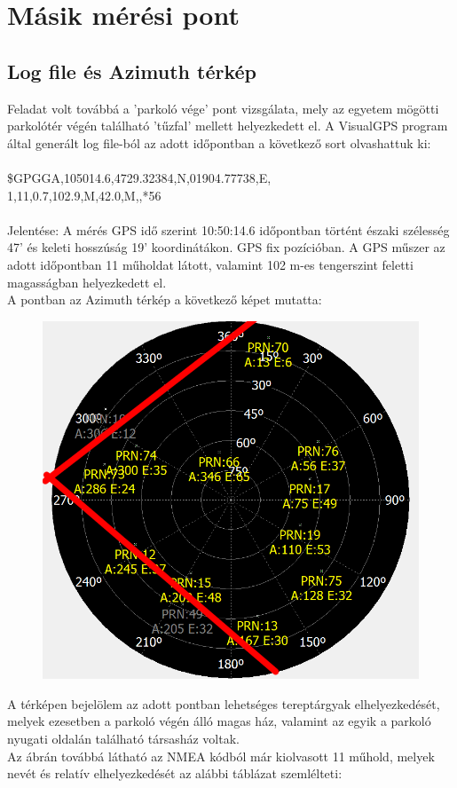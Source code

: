 \documentclass[10pt, conference,a4paper]{ITKproc}
\begin{document}
\section{Másik mérési pont}
\subsection{Log file és Azimuth térkép}
Feladat volt továbbá a 'parkoló vége' pont vizsgálata, mely az egyetem mögötti parkolótér végén található 'tűzfal' mellett helyezkedett el. A VisualGPS program által generált log file-ból az adott időpontban a következő sort olvashattuk ki: \\ \\
\$GPGGA,105014.6,4729.32384,N,01904.77738,E,\\1,11,0.7,102.9,M,42.0,M,,*56
\\ \\
Jelentése: A mérés GPS idő szerint 10:50:14.6 időpontban történt északi szélesség 47' és keleti hosszúság 19' koordinátákon. GPS fix pozícióban. A GPS műszer az adott időpontban 11 műholdat látott, valamint 102 m-es tengerszint feletti magasságban helyezkedett el. \\
A pontban az Azimuth térkép a következő képet mutatta: \\
\begin{figure}[h]
\includegraphics[scale=0.3]{azimuth_kozos_r}
\centering
\end{figure}
A térképen bejelölem az adott pontban lehetséges tereptárgyak elhelyezkedését, melyek ezesetben a parkoló végén álló magas ház, valamint az egyik a parkoló nyugati oldalán található társasház voltak. 
\\
Az ábrán továbbá látható az NMEA kódból már kiolvasott 11 műhold, melyek nevét és relatív elhelyezkedését az alábbi táblázat szemlélteti: 
\end{document}
